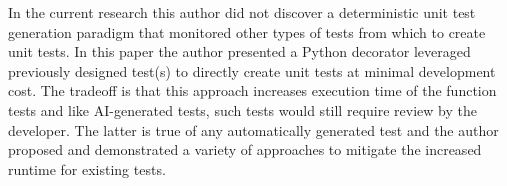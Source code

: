 In the current research this author did not discover a deterministic 
unit test generation paradigm that monitored other types of
tests from which to create unit tests.  In this paper the author presented
a Python decorator leveraged previously designed test(s) to directly create 
unit tests at minimal development cost.
The tradeoff is that this approach increases execution time of the function 
tests and like AI-generated tests, such tests would still require review by the 
developer. The latter is true of any automatically generated test and 
the author proposed and demonstrated a variety of approaches to 
mitigate the increased runtime for existing tests.

